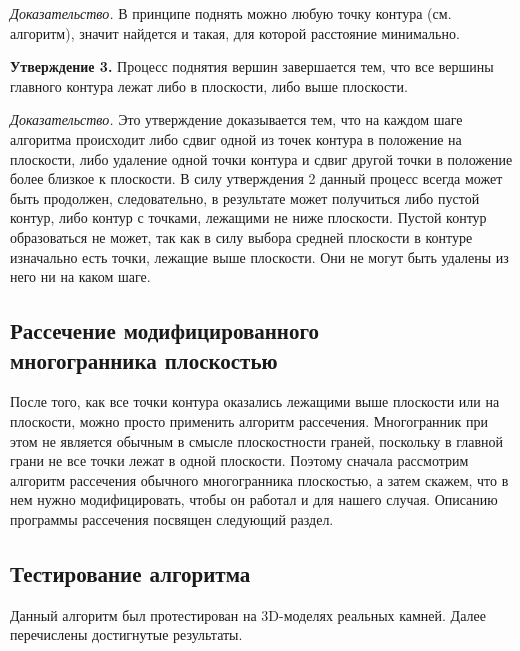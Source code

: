 \documentclass[a4paper,12pt, titlepage]{article}
\begin{document}
\begin{flushleft}
 \textit{Доказательство.} В принципе поднять можно любую точку контура (см. алгоритм), значит найдется
 и такая, для которой расстояние минимально.
\end{flushleft}

\begin{flushleft}
 \textbf{Утверждение 3.} Процесс поднятия вершин завершается тем, что все вершины главного контура лежат
либо в плоскости, либо выше плоскости.
\end{flushleft}

\begin{flushleft}
 \textit{Доказательство.} Это утверждение доказывается тем, что на каждом шаге алгоритма происходит либо 
сдвиг одной из точек контура в положение на плоскости, либо удаление одной точки контура и сдвиг другой точки
в положение более близкое к плоскости. В силу утверждения 2 данный процесс всегда может быть продолжен,
следовательно, в результате может получиться либо пустой контур, либо контур с точками, лежащими не ниже
плоскости. Пустой контур образоваться не может, так как в силу выбора средней плоскости в контуре изначально есть
точки, лежащие выше плоскости. Они не могут быть удалены из него ни на каком шаге.
\end{flushleft}


\subsection{Рассечение модифицированного \\многогранника плоскостью}
\begin{flushleft}
 После того, как все точки контура оказались лежащими выше плоскости или на плоскости, можно просто 
применить алгоритм рассечения. Многогранник при этом не является обычным в смысле плоскостности граней,
поскольку в главной грани не все точки лежат в одной плоскости. Поэтому сначала рассмотрим алгоритм
рассечения обычного многогранника плоскостью, а затем скажем, что в нем нужно модифицировать, чтобы он 
работал и для нашего случая. Описанию программы рассечения посвящен следующий раздел.
\end{flushleft}

\newpage
\subsection{Тестирование алгоритма}
\begin{flushleft}
 Данный алгоритм был протестирован на 3D-моделях реальных камней. Далее перечислены 
достигнутые результаты.
\end{flushleft}
\end{document}
